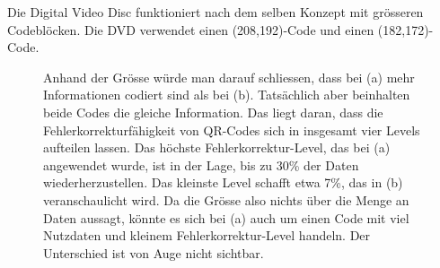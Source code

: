 Die Digital Video Disc funktioniert nach dem selben Konzept mit grösseren Codeblöcken. Die DVD verwendet einen (208,192)-Code und einen (182,172)-Code.


\begin{figure}
	\centering
	\caption{Anhand der Grösse würde man darauf schliessen, dass bei (a) mehr Informationen codiert sind als bei (b). Tatsächlich aber beinhalten beide Codes die gleiche Information. Das liegt daran, dass die Fehlerkorrekturfähigkeit von QR-Codes sich in insgesamt vier Levels aufteilen lassen. Das höchste Fehlerkorrektur-Level, das bei (a) angewendet wurde, ist in der Lage, bis zu 30\% der Daten wiederherzustellen. Das kleinste Level schafft etwa 7\%, das in (b) veranschaulicht wird. Da die Grösse also nichts über die Menge an Daten aussagt, könnte es sich bei (a) auch um einen Code mit viel Nutzdaten und kleinem Fehlerkorrektur-Level handeln. Der Unterschied ist von Auge nicht sichtbar.}
	\label{fig:qr}
\end{figure}

